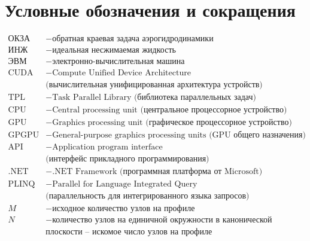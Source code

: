 \documentclass[12pt]{article}
\begin{document}
%
%
\tableofcontents

\newpage
\section*{Условные обозначения и сокращения}
%
%
\begin{align*}
 \textrm{ОКЗА} & - \textrm{обратная краевая задача аэрогидродинамики} \\
  \textrm{ИНЖ} & - \textrm{идеальная несжимаемая жидкость} \\
  \textrm{ЭВМ} & - \textrm{электронно-вычислительная машина} \\
 \textrm{CUDA} & - \textrm{Compute Unified Device Architecture} \\
 & \textrm{(вычислительная унифицированная архитектура устройств)} \\
 \textrm{TPL} & - \textrm{Task Parallel Library (библиотека параллельных задач)} \\
 \textrm{CPU} & - \textrm{Central processing unit (центральное процессорное устройство)} \\
 \textrm{GPU} & - \textrm{Graphics processing unit (графическое процессорное устройство)} \\
 \textrm{GPGPU} & - \textrm{General-purpose graphics processing
 units (GPU общего назначения)} \\
 \textrm{API} & - \textrm{Application program interface}\\&  \textrm{(интерфейс прикладного программирования)} \\
 \textrm{.NET} & - \textrm{.NET Framework (программная платформа от
 Microsoft)} \\
 \textrm{PLINQ} & - \textrm{Parallel for Language Integrated Query }\\&  \textrm{(параллельность для интегрированного языка
 запросов)} \\
  M & - \textrm{исходное количество узлов на профиле} \\
  N & - \textrm{количество узлов на единичной окружности в канонической}\\&  \textrm{плоскости -- искомое число узлов на
  профиле} \\
\end{align*}
\end{document}
